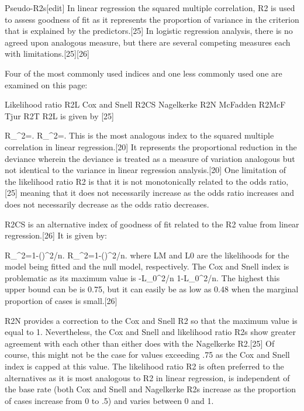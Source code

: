 Pseudo-R2s[edit]
In linear regression the squared multiple correlation, R2 is used to assess goodness of fit as it represents the proportion of variance in the criterion that is explained by the predictors.[25] In logistic regression analysis, there is no agreed upon analogous measure, but there are several competing measures each with limitations.[25][26]

Four of the most commonly used indices and one less commonly used one are examined on this page:

Likelihood ratio R2L
Cox and Snell R2CS
Nagelkerke R2N
McFadden R2McF
Tjur R2T
R2L is given by [25]

{\displaystyle R_{}^{2}={}.} R_{}^{2}={}.
This is the most analogous index to the squared multiple correlation in linear regression.[20] It represents the proportional reduction in the deviance wherein the deviance is treated as a measure of variation analogous but not identical to the variance in linear regression analysis.[20] One limitation of the likelihood ratio R2 is that it is not monotonically related to the odds ratio,[25] meaning that it does not necessarily increase as the odds ratio increases and does not necessarily decrease as the odds ratio decreases.

R2CS is an alternative index of goodness of fit related to the R2 value from linear regression.[26] It is given by:

{\displaystyle R_{}^{2}=1-\left({}\right)^{2/n}.} {\displaystyle R_{}^{2}=1-\left({}\right)^{2/n}.}
where LM and L0 are the likelihoods for the model being fitted and the null model, respectively. The Cox and Snell index is problematic as its maximum value is {-L_{0}^{2/n}} 1-L_{0}^{2/n}. The highest this upper bound can be is 0.75, but it can easily be as low as 0.48 when the marginal proportion of cases is small.[26]

R2N provides a correction to the Cox and Snell R2 so that the maximum value is equal to 1. Nevertheless, the Cox and Snell and likelihood ratio R2s show greater agreement with each other than either does with the Nagelkerke R2.[25] Of course, this might not be the case for values exceeding .75 as the Cox and Snell index is capped at this value. The likelihood ratio R2 is often preferred to the alternatives as it is most analogous to R2 in linear regression, is independent of the base rate (both Cox and Snell and Nagelkerke R2s increase as the proportion of cases increase from 0 to .5) and varies between 0 and 1.

